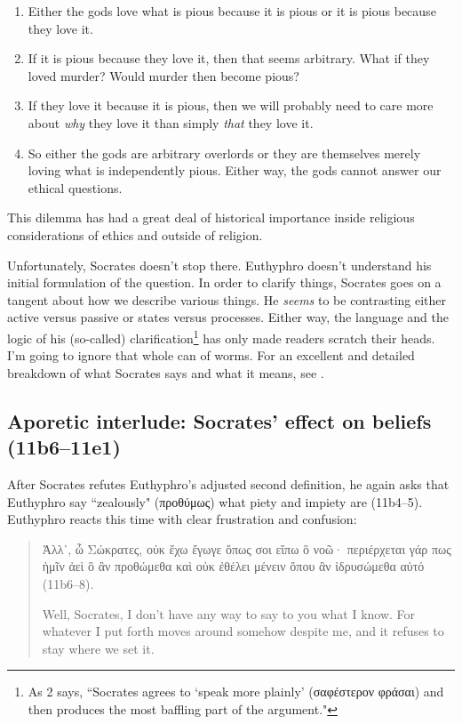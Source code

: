 \documentclass[11pt]{article}
\begin{document}
\begin{enumerate}
    \item Either the gods love what is pious because it is pious or it is
        pious because they love it.
    \item If it is pious because they love it, then that seems arbitrary.
        What if they loved murder?  Would murder then become pious?
    \item If they love it because it is pious, then we will probably need
        to care more about \emph{why} they love it than simply \emph{that}
        they love it.
    \item So either the gods are arbitrary overlords or they are themselves
        merely loving what is independently pious.  Either way, the gods
        cannot answer our ethical questions.
\end{enumerate}

This dilemma has had a great deal of historical importance inside religious
considerations of ethics and outside of religion.

Unfortunately, Socrates doesn't stop there.  Euthyphro doesn't understand
his initial formulation of the question.  In order to clarify things,
Socrates goes on a tangent about how we describe various things.  He
\emph{seems} to be contrasting either active versus passive or states
versus processes.  Either way, the language and the logic of his
(so-called) clarification\footnote{As \cite{cohen1971} 2 says, ``Socrates
agrees to `speak more plainly' (σαφέστερον φράσαι) and then produces the
most baffling part of the argument."} has only made readers scratch their
heads.  I'm going to ignore that whole can of worms.  For an excellent and
detailed breakdown of what Socrates says and what it means, see
\citet{cohen1971}.

\subsection{Aporetic interlude: Socrates' effect on beliefs (11b6--11e1)}
After Socrates refutes Euthyphro's adjusted second definition, he again
asks that Euthyphro say ``zealously" (προθύμως) what piety and impiety are
(11b4--5).  Euthyphro reacts this time with clear frustration and
confusion:

\begin{quote}
    Ἀλλ᾽, ὦ Σώκρατες, οὐκ ἔχω ἔγωγε ὅπως σοι εἴπω ὃ νοῶ· περιέρχεται γάρ
    πως ἡμῖν ἀεὶ ὃ ἂν προθώμεθα καὶ οὐκ ἐθέλει μένειν ὅπου ἂν ἱδρυσώμεθα
    αὐτό (11b6--8).

    Well, Socrates, I don't have any way to say to you what I know. For
    whatever I put forth moves around somehow despite me, and it refuses
    to stay where we set it.
\end{quote}
\end{document}
